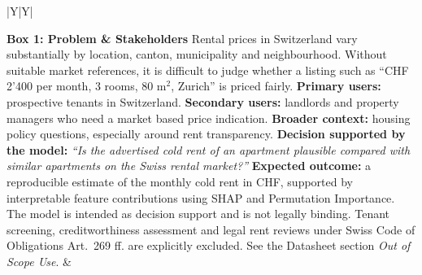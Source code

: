 \documentclass[11pt, a4paper]{article}
\begin{document}
{\scriptsize
\begin{xltabular}{\textwidth}{|Y|Y|}
    \hline

    \textbf{\color{accent}Box 1: Problem \& Stakeholders} \newline
    Rental prices in Switzerland vary substantially by location, canton, municipality and neighbourhood. Without suitable market references, it is difficult to judge whether a listing such as ``CHF 2'400 per month, 3 rooms, 80 m$^2$, Zurich'' is priced fairly.
    \newline\newline
    \textbf{Primary users:} prospective tenants in Switzerland. \textbf{Secondary users:} landlords and property managers who need a market based price indication. \textbf{Broader context:} housing policy questions, especially around rent transparency.
    \newline\newline
    \textbf{Decision supported by the model:} \emph{``Is the advertised cold rent of an apartment plausible compared with similar apartments on the Swiss rental market?''}
    \newline\newline
    \textbf{Expected outcome:} a reproducible estimate of the monthly cold rent in CHF, supported by interpretable feature contributions using SHAP and Permutation Importance. The model is intended as decision support and is not legally binding. Tenant screening, creditworthiness assessment and legal rent reviews under Swiss Code of Obligations Art.\ 269 ff. are explicitly excluded. See the Datasheet section \emph{Out of Scope Use}.
    &


\end{xltabular}}
\end{document}
